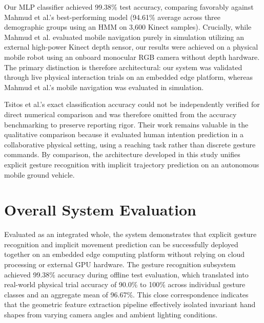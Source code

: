 \begin{table}[H]
\centering
\caption{Benchmarking Against Reviewed Gesture Recognition Systems}
\label{tab:benchmarking}
\end{table}

Our MLP classifier achieved 99.38\% test accuracy, comparing favorably against Mahmud et al.'s best-performing model (94.61\% average across three demographic groups using an HMM on 3,600 Kinect samples). Crucially, while Mahmud et al. evaluated mobile navigation purely in simulation utilizing an external high-power Kinect depth sensor, our results were achieved on a physical mobile robot using an onboard monocular RGB camera without depth hardware. The primary distinction is therefore architectural: our system was validated through live physical interaction trials on an embedded edge platform, whereas Mahmud et al.'s mobile navigation was evaluated in simulation.

Tsitos et al.'s exact classification accuracy could not be independently verified for direct numerical comparison and was therefore omitted from the accuracy benchmarking to preserve reporting rigor. Their work remains valuable in the qualitative comparison because it evaluated human intention prediction in a collaborative physical setting, using a reaching task rather than discrete gesture commands. By comparison, the architecture developed in this study unifies explicit gesture recognition with implicit trajectory prediction on an autonomous mobile ground vehicle.

\section{Overall System Evaluation}
Evaluated as an integrated whole, the system demonstrates that explicit gesture recognition and implicit movement prediction can be successfully deployed together on an embedded edge computing platform without relying on cloud processing or external GPU hardware. The gesture recognition subsystem achieved 99.38\% accuracy during offline test evaluation, which translated into real-world physical trial accuracy of 90.0\% to 100\% across individual gesture classes and an aggregate mean of 96.67\%. This close correspondence indicates that the geometric feature extraction pipeline effectively isolated invariant hand shapes from varying camera angles and ambient lighting conditions.


